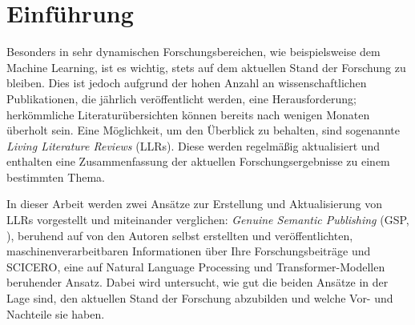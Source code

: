 \section{Einführung}
\label{sec:einfuehrung}

Besonders in sehr dynamischen Forschungsbereichen, wie beispielsweise dem Machine Learning, ist es wichtig, stets auf dem aktuellen Stand der Forschung zu bleiben.
Dies ist jedoch aufgrund der hohen Anzahl an wissenschaftlichen Publikationen, die jährlich veröffentlicht werden, eine Herausforderung; herkömmliche Literaturübersichten können bereits nach wenigen Monaten überholt sein.
Eine Möglichkeit, um den Überblick zu behalten, sind sogenannte \textit{Living Literature Reviews} (LLRs).
Diese werden regelmäßig aktualisiert und enthalten eine Zusammenfassung der aktuellen Forschungsergebnisse zu einem bestimmten Thema.

In dieser Arbeit werden zwei Ansätze zur Erstellung und Aktualisierung von LLRs vorgestellt und miteinander verglichen:
\textit{Genuine Semantic Publishing} (GSP, \cite{kuhn2017genuine}), beruhend auf von den Autoren selbst erstellten und veröffentlichten, maschinenverarbeitbaren Informationen über Ihre Forschungsbeiträge und SCICERO, eine auf Natural Language Processing und Transformer-Modellen beruhender Ansatz.
Dabei wird untersucht, wie gut die beiden Ansätze in der Lage sind, den aktuellen Stand der Forschung abzubilden und welche Vor- und Nachteile sie haben.
